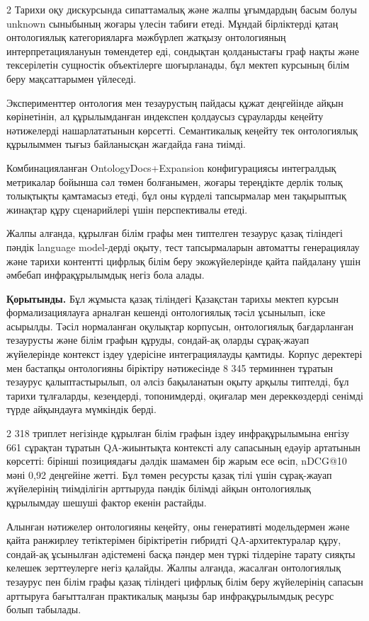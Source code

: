 \begin{multicols}{2}
Тарихи оқу дискурсында сипаттамалық және жалпы ұғымдардың басым болуы
unknown сыныбының жоғары үлесін табиғи етеді. Мұндай бірліктерді қатаң
онтологиялық категорияларға мәжбүрлеп жатқызу онтологияның
интерпретациялануын төмендетер еді, сондықтан қолданыстағы граф нақты
және тексерілетін сущностік объектілерге шоғырланады, бұл мектеп
курсының білім беру мақсаттарымен үйлеседі.

Эксперименттер онтология мен тезаурустың пайдасы құжат деңгейінде айқын
көрінетінін, ал құрылымданған индекспен қолдаусыз сұрауларды кеңейту
нәтижелерді нашарлататынын көрсетті. Семантикалық кеңейту тек
онтологиялық құрылыммен тығыз байланысқан жағдайда ғана тиімді.

Комбинацияланған OntologyDocs+Expansion конфигурациясы интегралдық
метрикалар бойынша сәл төмен болғанымен, жоғары тереңдікте дерлік толық
толықтықты қамтамасыз етеді, бұл оны күрделі тапсырмалар мен тақырыптық
жинақтар құру сценарийлері үшін перспективалы етеді.

Жалпы алғанда, құрылған білім графы мен типтелген тезаурус қазақ
тіліндегі пәндік language model-дерді оқыту, тест тапсырмаларын
автоматты генерациялау және тарихи контентті цифрлық білім беру
экожүйелерінде қайта пайдалану үшін әмбебап инфрақұрылымдық негіз бола
алады.

{\bfseries Қорытынды.} Бұл жұмыста қазақ тіліндегі Қазақстан тарихы мектеп
курсын формализациялауға арналған кешенді онтологиялық тәсіл ұсынылып,
іске асырылды. Тәсіл нормаланған оқулықтар корпусын, онтологиялық
бағдарланған тезаурусты және білім графын құруды, сондай-ақ оларды
сұрақ-жауап жүйелерінде контекст іздеу үдерісіне интеграциялауды
қамтиды. Корпус деректері мен бастапқы онтологияны біріктіру нәтижесінде
8 345 терминнен тұратын тезаурус қалыптастырылып, ол әлсіз бақыланатын
оқыту арқылы типтелді, бұл тарихи тұлғаларды, кезеңдерді, топонимдерді,
оқиғалар мен дереккөздерді сенімді түрде айқындауға мүмкіндік берді.

2 318 триплет негізінде құрылған білім графын іздеу инфрақұрылымына
енгізу 661 сұрақтан тұратын QA-жиынтықта контексті алу сапасының едәуір
артатынын көрсетті: бірінші позициядағы дәлдік шамамен бір жарым есе
өсіп, nDCG@10 мәні 0,92 деңгейіне жетті. Бұл төмен ресурсты қазақ тілі
үшін сұрақ-жауап жүйелерінің тиімділігін арттыруда пәндік білімді айқын
онтологиялық құрылымдау шешуші фактор екенін растайды.

Алынған нәтижелер онтологияны кеңейту, оны генеративті модельдермен және
қайта ранжирлеу тетіктерімен біріктіретін гибридті QA-архитектуралар
құру, сондай-ақ ұсынылған әдістемені басқа пәндер мен түркі тілдеріне
тарату сияқты келешек зерттеулерге негіз қалайды. Жалпы алғанда,
жасалған онтологиялық тезаурус пен білім графы қазақ тіліндегі цифрлық
білім беру жүйелерінің сапасын арттыруға бағытталған практикалық маңызы
бар инфрақұрылымдық ресурс болып табылады.
\end{multicols}

